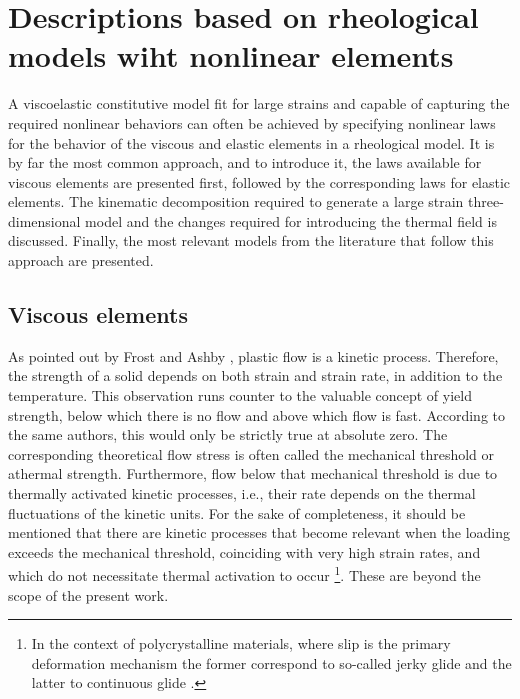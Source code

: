 \section{Descriptions based on rheological models wiht nonlinear elements}

A viscoelastic constitutive model fit for large strains and capable of capturing the required nonlinear behaviors can often be achieved by specifying nonlinear laws for the behavior of the viscous and elastic elements in a rheological model.
It is by far the most common approach, and to introduce it, the laws available for viscous elements are presented first, followed by the corresponding laws for elastic elements.
The kinematic decomposition required to generate a large strain three-dimensional model and the changes required for introducing the thermal field is discussed.
Finally, the most relevant models from the literature that follow this approach are presented.


\subsection{Viscous elements}
\label{sec:viscous_elements}

As pointed out by Frost and Ashby \citep{frostDeformationmechanismMapsPlasticity1982}, plastic flow is a kinetic process.
Therefore, the strength of a solid depends on both strain and strain rate, in addition to the temperature.
This observation runs counter to the valuable concept of yield strength, below which there is no flow and above which flow is fast.
According to the same authors, this would only be strictly true at absolute zero.
The corresponding theoretical flow stress is often called the mechanical threshold or athermal strength.
Furthermore, flow below that mechanical threshold is due to thermally activated kinetic processes, i.e., their rate depends on the thermal fluctuations of the kinetic units.
For the sake of completeness, it should be mentioned that there are kinetic processes that become relevant when the loading exceeds the mechanical threshold, coinciding with very high strain rates, and which do not necessitate thermal activation to occur \citep{kocks1975thermodynamics}\footnote{In the context of polycrystalline materials, where slip is the primary deformation mechanism the former correspond to so-called jerky glide and the latter to continuous glide \citep{kocks1975thermodynamics}.}.
These are beyond the scope of the present work.

